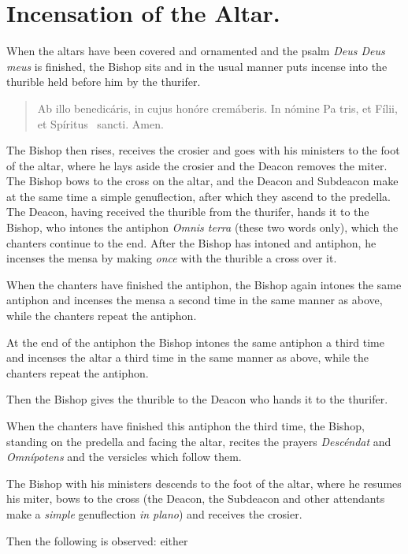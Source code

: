 \documentclass[letterpaper]{report}
\newcommand\blessincense{
\begin{quote}
   Ab illo benedicáris, in cujus honóre cremáberis. In nómine Pa\cross
    tris, et Fí\cross lii, et Spíritus \cross\ sancti. \rbar Amen.
\end{quote}
}
\begin{document}
{    \section{Incensation of the Altar.}

    \rubric When the altars have been covered and ornamented and the psalm
    \textit{Deus Deus meus} is finished, the Bishop sits and in the usual manner
    puts incense into the thurible held before him by the thurifer.

    \blessincense

    The Bishop then rises, receives the crosier and goes with his ministers to the
    foot of the altar, where he lays aside the crosier and the Deacon removes the
    miter. The Bishop bows to the cross on the altar, and the Deacon and Subdeacon
    make at the same time a simple genuflection, after which they ascend to the
    predella. The Deacon, having received the thurible from the thurifer, hands it
    to the Bishop, who intones the antiphon \textit{Omnis terra} (these two words
    only), which the chanters continue to the end. After the Bishop has intoned and
    antiphon, he incenses the mensa by making \textit{once} with the thurible a
    cross over it.

    \rubric When the chanters have finished the antiphon, the Bishop again intones
    the same antiphon and incenses the mensa a second time in the same manner as
    above, while the chanters repeat the antiphon.

    \rubric At the end of the antiphon the Bishop intones the same antiphon a third
    time and incenses the altar a third time in the same manner as above, while the
    chanters repeat the antiphon.

    Then the Bishop gives the thurible to the Deacon who hands it to the thurifer.

    \rubric When the chanters have finished this antiphon the third time, the
    Bishop, standing on the predella and facing the altar, recites the prayers
    \textit{Descéndat} and \textit{Omnípotens} and the versicles which follow them.

    \rubric The Bishop with his ministers descends to the foot of the altar, where
    he resumes his miter, bows to the cross (the Deacon, the Subdeacon and other
    attendants make a \textit{simple} genuflection \textit{in plano}) and receives
    the crosier.

    Then the following is observed: either

    \begin{enumerate}


\end{enumerate}}
\end{document}
